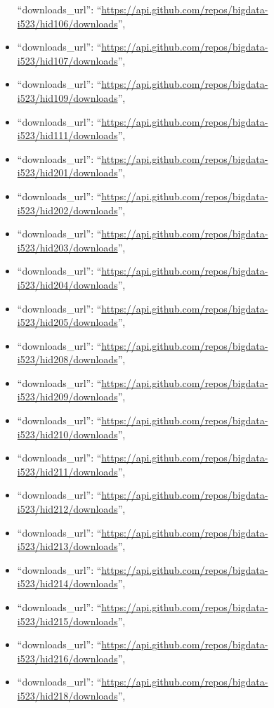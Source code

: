 \begin{itemize}
  ``downloads\_url'':
  ``\url{https://api.github.com/repos/bigdata-i523/hid106/downloads}'',
\item
  ``downloads\_url'':
  ``\url{https://api.github.com/repos/bigdata-i523/hid107/downloads}'',
\item
  ``downloads\_url'':
  ``\url{https://api.github.com/repos/bigdata-i523/hid109/downloads}'',
\item
  ``downloads\_url'':
  ``\url{https://api.github.com/repos/bigdata-i523/hid111/downloads}'',
\item
  ``downloads\_url'':
  ``\url{https://api.github.com/repos/bigdata-i523/hid201/downloads}'',
\item
  ``downloads\_url'':
  ``\url{https://api.github.com/repos/bigdata-i523/hid202/downloads}'',
\item
  ``downloads\_url'':
  ``\url{https://api.github.com/repos/bigdata-i523/hid203/downloads}'',
\item
  ``downloads\_url'':
  ``\url{https://api.github.com/repos/bigdata-i523/hid204/downloads}'',
\item
  ``downloads\_url'':
  ``\url{https://api.github.com/repos/bigdata-i523/hid205/downloads}'',
\item
  ``downloads\_url'':
  ``\url{https://api.github.com/repos/bigdata-i523/hid208/downloads}'',
\item
  ``downloads\_url'':
  ``\url{https://api.github.com/repos/bigdata-i523/hid209/downloads}'',
\item
  ``downloads\_url'':
  ``\url{https://api.github.com/repos/bigdata-i523/hid210/downloads}'',
\item
  ``downloads\_url'':
  ``\url{https://api.github.com/repos/bigdata-i523/hid211/downloads}'',
\item
  ``downloads\_url'':
  ``\url{https://api.github.com/repos/bigdata-i523/hid212/downloads}'',
\item
  ``downloads\_url'':
  ``\url{https://api.github.com/repos/bigdata-i523/hid213/downloads}'',
\item
  ``downloads\_url'':
  ``\url{https://api.github.com/repos/bigdata-i523/hid214/downloads}'',
\item
  ``downloads\_url'':
  ``\url{https://api.github.com/repos/bigdata-i523/hid215/downloads}'',
\item
  ``downloads\_url'':
  ``\url{https://api.github.com/repos/bigdata-i523/hid216/downloads}'',
\item
  ``downloads\_url'':
  ``\url{https://api.github.com/repos/bigdata-i523/hid218/downloads}'',

\end{itemize}
